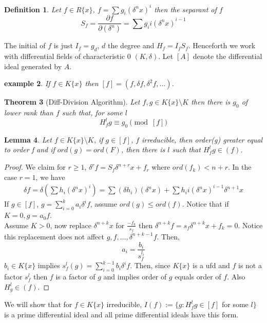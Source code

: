 \documentclass[letterpaper, 12pt]{article}
\newcommand{\fin}{\qquad \quad \hfill \framebox[1.75mm][l]{\,}}
\theoremstyle{stdthm}
\newtheorem{thm}{Theorem}[section]
\newtheorem{lem}[thm]{Lemma}
\theoremstyle{stddef}
\newtheorem{defn}[thm]{Definition}
\newtheorem{eg}[thm]{example} %
\theoremstyle{stdnonum}
\theoremstyle{stdqands}
\theoremstyle{stdbold}
\begin{document}
\begin{defn}
Let $f \in R\{x\}$, $f = \sum g_i(\delta^n x)^i$ then the separant of $f$ 
\[ S_f = \frac{\partial f}{\partial (\delta^n)} = \sum g_i i(\delta^n x)^{i-1} \] 
\end{defn}
The initial of $f$ is just $I_f = g_d$, $d$ the degree and $H_f = I_f S_f$. Henceforth we work with differential fields of characteristic 0 $(K,\delta)$.  Let $[A]$ denote the differential ideal generated by $A$. 

\begin{eg}
If $f\in K \{x\}$ then $[f] = (f,\delta f, \delta^2f ,\dots)$. 
\end{eg}

\begin{thm} [Diff-Division Algorithm]
Let $f,g \in K\{x\} \setminus K$ then there is $g_0$ of lower rank than $f$ such that, for some $l$ 
\[ H_f^l g \equiv g_0 \pmod [f] \] 

\end{thm}

\begin{lem}
Let $f \in K\{x\} \setminus K$, if $g \in [f]$, $f$ irreducible, then order(g) greater equal to order f and if $ord(g) = ord(F)$, then there is $l$ such that $H_f^l g \in (f)$. 
\end{lem}

\begin{proof}
We claim for $r\geq 1$, $\delta^r f = S_f \delta^{n+r}x + f_r$ where $ord(f_k) < n+r$. In the case $r=1$, we have 
\begin{align*}
\delta f = \delta \left( \sum h_i (\delta^n x)^i \right) = \sum (\delta h_i) (\delta^n x) + \sum h_i i(\delta^n x) ^{i-1} \delta^{n+1} x 
\end{align*}
If $g \in [f]$, $g = \sum_{i=0}^k a_i \delta^i f$, assume $ord(g)\leq ord(f)$. Notice that if $K = 0, g = a_0 f$. \\

Assume $K >0$, now replace $\delta^{n+k} x$ for $\frac{-f_k}{s_f}$ then $\delta^{n+k}f = s_f \delta^{n+k} x + f_k = 0$. Notice this replacement does not affect $g,f,\dots, \delta^{n+k-1} f$. Then, 
\[ a_i = \frac{b_i}{s_f^{l_i}} \]
$b_i \in K\{x\}$ implies $s_f^l(g) = \sum_{i=0}^{k-1} b_i \delta^i f$.  Then, since $K\{x\}$ is a ufd and $f$ is not a factor $s_f^l$ then $f$ is a factor of $g$ and implies order of $g$ equals order of $f$. Also $H_g^l \in (f)$. 
\end{proof}

We will show that for $f \in K\{x\}$ irreducible, $I(f) := \{g: H_f^l g \in [f] $ for some $l \}$ is a prime differential ideal and all prime differential ideals have this form. 
\end{document}
